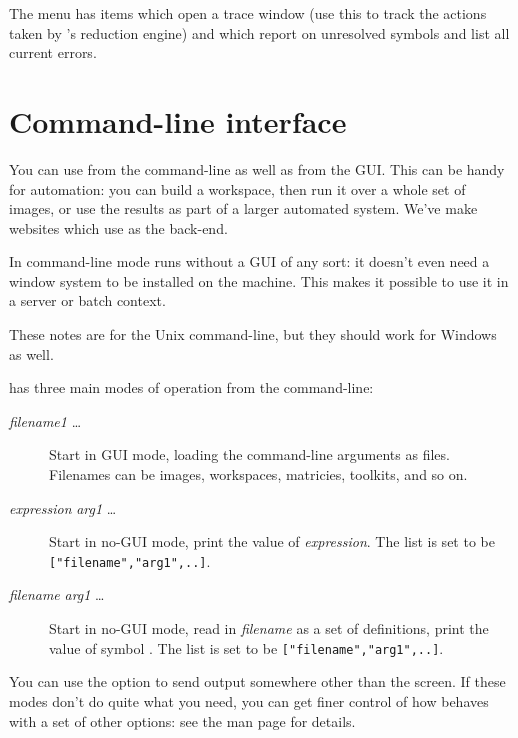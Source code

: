 The  menu has items which open a trace window (use this to track
the actions taken by \nip{}'s reduction engine) and which report on unresolved
symbols and list all current errors.

\section{Command-line interface}

You can use \nip{} from the command-line as well as from the GUI. This can be
handy for automation: you can build a workspace, then run it over a whole set
of images, or use the results as part of a larger automated system. We've make
websites which use \nip{} as the back-end.

In command-line mode \nip{} runs without a GUI of any sort: it doesn't
even need a window system to be installed on the machine. This makes it
possible to use it in a server or batch context.

These notes are for the Unix command-line, but they should work for Windows as
well.

\nip{} has three main modes of operation from the command-line:

\begin{description}

\item[\nip{} \emph{filename1} \ldots{}]
Start \nip{} in GUI mode, loading the command-line arguments as files.
Filenames can be images, workspaces, matricies, toolkits, and so on.

\item[\nip{}  \emph{expression} \emph{arg1} \ldots{}]
Start in no-GUI mode, print the value of \emph{expression}. The list
 is set to be \verb+["filename","arg1",..]+.

\item[\nip{}  \emph{filename} \emph{arg1} \ldots{}] Start
in no-GUI mode, read in \emph{filename} as a set of definitions,
print the value of symbol .  The list  is set to be
\verb+["filename","arg1",..]+.

\end{description}

You can use the  option to send output somewhere other than the
screen. If these modes don't do quite what you need, you can get finer control
of how \nip{} behaves with a set of other options: see the man page for
details.

